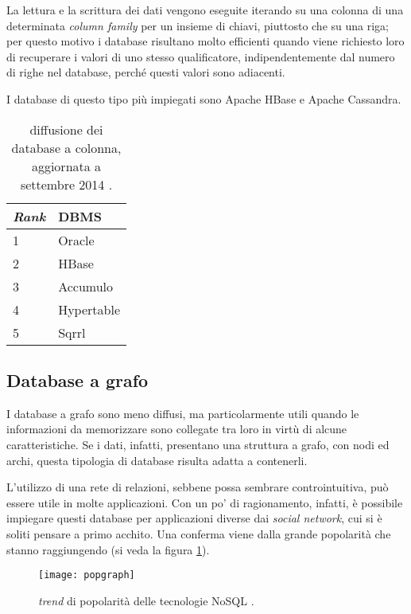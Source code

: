 La lettura e la scrittura dei dati vengono eseguite iterando su una colonna di una determinata \textit{column family} per un insieme di chiavi, piuttosto che su una riga; per questo motivo i 
database risultano molto efficienti quando viene richiesto loro di recuperare i valori di uno stesso qualificatore, indipendentemente dal numero di righe nel database, perché questi 
valori sono adiacenti.

I database di questo tipo più impiegati sono Apache HBase e Apache Cassandra.

\begin{table}[ht]
\centering
\begin{tabular}{|l|l|}
\hline
\textit{Rank} & DBMS       \\ \hline
1             & Oracle     \\
2             & HBase      \\
3             & Accumulo   \\
4             & Hypertable \\
5             & Sqrrl      \\ \hline
\end{tabular}
\caption{diffusione dei database a colonna, aggiornata a settembre 2014 \cite{URL:dbengines}.}
\end{table}


\subsection{Database a grafo}

I database a grafo sono meno diffusi, ma particolarmente utili quando le informazioni da memorizzare sono collegate tra loro in virtù di alcune caratteristiche. Se i dati, 
infatti, presentano una struttura a grafo, con nodi ed archi, questa tipologia di database risulta adatta a contenerli. 

L’utilizzo di una rete di relazioni, sebbene possa sembrare controintuitiva, può essere utile in molte applicazioni. Con un po’ di ragionamento, infatti, è possibile impiegare 
questi database per applicazioni diverse dai \textit{social network}, cui si è soliti pensare a primo acchito. Una conferma viene dalla grande popolarità che stanno raggiungendo (si veda la
figura \ref{graphnosql}).

\begin{figure}[ht]
\centering
\texttt{[image: popgraph]}
\caption{\textit{trend} di popolarità delle tecnologie NoSQL \cite{URL:dbengines}.}
\label{graphnosql}
\end{figure}

